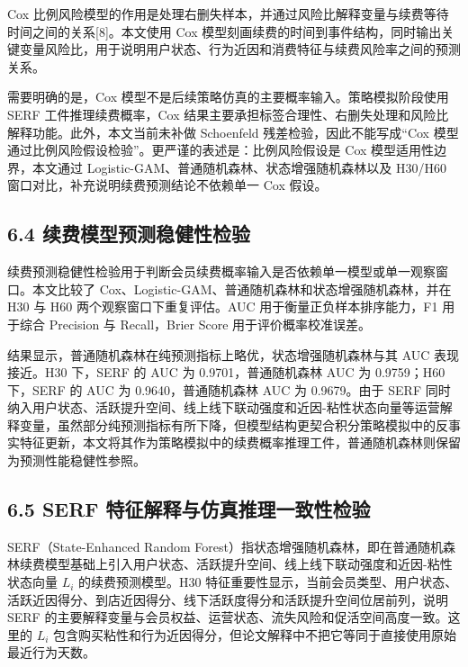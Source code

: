 \documentclass[
  12pt,
]{ctexart}
\begin{document}
Cox 比例风险模型的作用是处理右删失样本，并通过风险比解释变量与续费等待时间之间的关系{[}8{]}。本文使用 Cox 模型刻画续费的时间到事件结构，同时输出关键变量风险比，用于说明用户状态、行为近因和消费特征与续费风险率之间的预测关系。

需要明确的是，Cox 模型不是后续策略仿真的主要概率输入。策略模拟阶段使用 SERF 工件推理续费概率，Cox 结果主要承担标签合理性、右删失处理和风险比解释功能。此外，本文当前未补做 Schoenfeld 残差检验，因此不能写成``Cox 模型通过比例风险假设检验''。更严谨的表述是：比例风险假设是 Cox 模型适用性边界，本文通过 Logistic-GAM、普通随机森林、状态增强随机森林以及 H30/H60 窗口对比，补充说明续费预测结论不依赖单一 Cox 假设。

\hypertarget{ux7eedux8d39ux6a21ux578bux9884ux6d4bux7a33ux5065ux6027ux68c0ux9a8c}{%
\subsection{6.4 续费模型预测稳健性检验}\label{ux7eedux8d39ux6a21ux578bux9884ux6d4bux7a33ux5065ux6027ux68c0ux9a8c}}

续费预测稳健性检验用于判断会员续费概率输入是否依赖单一模型或单一观察窗口。本文比较了 Cox、Logistic-GAM、普通随机森林和状态增强随机森林，并在 H30 与 H60 两个观察窗口下重复评估。AUC 用于衡量正负样本排序能力，F1 用于综合 Precision 与 Recall，Brier Score 用于评价概率校准误差。

结果显示，普通随机森林在纯预测指标上略优，状态增强随机森林与其 AUC 表现接近。H30 下，SERF 的 AUC 为 0.9701，普通随机森林 AUC 为 0.9759；H60 下，SERF 的 AUC 为 0.9640，普通随机森林 AUC 为 0.9679。由于 SERF 同时纳入用户状态、活跃提升空间、线上线下联动强度和近因-粘性状态向量等运营解释变量，虽然部分纯预测指标有所下降，但模型结构更契合积分策略模拟中的反事实特征更新，本文将其作为策略模拟中的续费概率推理工件，普通随机森林则保留为预测性能稳健性参照。

\hypertarget{serf-ux7279ux5f81ux89e3ux91caux4e0eux4effux771fux63a8ux7406ux4e00ux81f4ux6027ux68c0ux9a8c}{%
\subsection{6.5 SERF 特征解释与仿真推理一致性检验}\label{serf-ux7279ux5f81ux89e3ux91caux4e0eux4effux771fux63a8ux7406ux4e00ux81f4ux6027ux68c0ux9a8c}}

SERF（State-Enhanced Random Forest）指状态增强随机森林，即在普通随机森林续费模型基础上引入用户状态、活跃提升空间、线上线下联动强度和近因-粘性状态向量 \(L_i\) 的续费预测模型。H30 特征重要性显示，当前会员类型、用户状态、活跃近因得分、到店近因得分、线下活跃度得分和活跃提升空间位居前列，说明 SERF 的主要解释变量与会员权益、运营状态、流失风险和促活空间高度一致。这里的 \(L_i\) 包含购买粘性和行为近因得分，但论文解释中不把它等同于直接使用原始最近行为天数。
\end{document}
